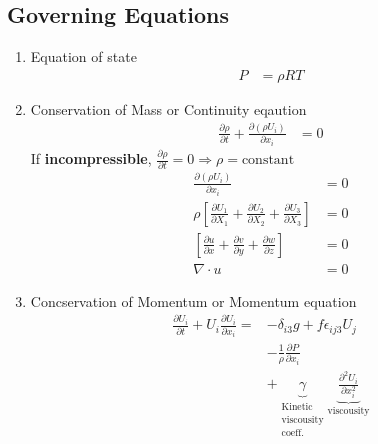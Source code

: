 \documentclass[fleqn,10pt]{SelfArx} %
\begin{document}
\subsection{Governing Equations}
\begin{enumerate}[noitemsep]
	\item Equation of state
	      \begin{align*}
		      P & = \rho RT \tag{7.1} \label{eq:idealgaeq}
	      \end{align*}
	\item Conservation of Mass or Continuity eqaution
	      \begin{align*}
		      \frac{\partial \rho}{\partial t} + \frac{\partial \left(\rho U_i\right)}{\partial x_i} & = 0 \tag{7.2} \label{eq:continuityeq}
	      \end{align*}
	      If \textbf{incompressible}, $\frac{\partial \rho}{\partial t} = 0 \Rightarrow \rho = \text{constant}$
	      \begin{align*}
		      \frac{\partial \left(\rho U_i\right)}{\partial x_i}                                                                        & = 0                                 \\
		      \rho\left[\frac{\partial U_1}{\partial X_1} + \frac{\partial U_2}{\partial X_2} + \frac{\partial U_3}{\partial X_3}\right] & = 0                                 \\
		      \left[\frac{\partial u}{\partial x} + \frac{\partial v}{\partial y} + \frac{\partial w}{\partial z}\right]                 & = 0                                 \\
		      \nabla \cdot u                                                                                                             & = 0 \tag{7.3} \label{eq:idealgaeq1}
	      \end{align*}
	\item Concservation of Momentum or Momentum equation
	      \begin{align*}
		      \frac{\partial U_i}{\partial t} + U_i\frac{\partial U_i}{\partial x_i} = & -\delta_{i3}g + f\epsilon_{ij3}U_j \\ &- \frac{1}{\rho}\frac{\partial P}{\partial x_i} \\ &+ \underbrace{\gamma}_{\substack{\text{Kinetic} \\ \text{viscousity} \\ \text{coeff.}}}\underbrace{\frac{\partial^2 U_i}{\partial x_i^2}}_{\text{viscousity}} \tag{7.4} \label{eq:momentumeq}
	      \end{align*}

\end{enumerate}
\end{document}
